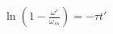 \documentclass[preview]{standalone}
\begin{document}
\begin{center}
$\ln\left(1-\frac{\omega'}{\omega_{ss}}\right)=-\tau t'$
\end{center}
\end{document}

